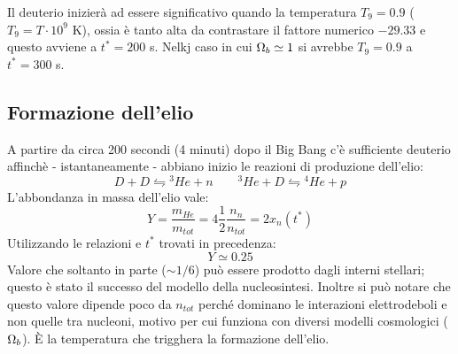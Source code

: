 Il deuterio inizierà ad essere significativo quando la temperatura $T_9=0.9$ ($T_9=T\cdot 10^{9}$ K), ossia è tanto alta da contrastare il fattore numerico $-29.33$ e questo avviene a $t^*=200$ s. Nelkj caso in cui $\Omega_{b} \simeq 1$ si avrebbe $T_9=0.9$ a $t^*=300$ s.

\subsection{Formazione dell'elio}
A partire da circa 200 secondi (4 minuti) dopo il Big Bang c'è sufficiente deuterio affinchè - istantaneamente - abbiano inizio le reazioni di produzione dell'elio:
$$
D + D \leftrightharpoons {^3He} + n \qquad {^3He} + D \leftrightharpoons {^4He} + p 
$$
L'abbondanza in massa dell'elio vale:
\begin{equation}
    Y = \frac{m_{He}}{m_{tot}} = 4 \frac{1}{2} \frac{n_n}{n_{tot}} = 2 x_n(t^*)
\end{equation}
Utilizzando le relazioni e $t^*$ trovati in precedenza:
$$
Y\simeq 0.25
$$
Valore che soltanto in parte ($\sim 1/6$) può essere prodotto dagli interni stellari; questo è stato il successo del modello della nucleosintesi. Inoltre si può notare che questo valore dipende poco da $n_{tot}$ perché dominano le interazioni elettrodeboli e non quelle tra nucleoni, motivo per cui funziona con diversi modelli cosmologici ($\Omega_{b}$). È la temperatura che trigghera la formazione dell'elio. 


